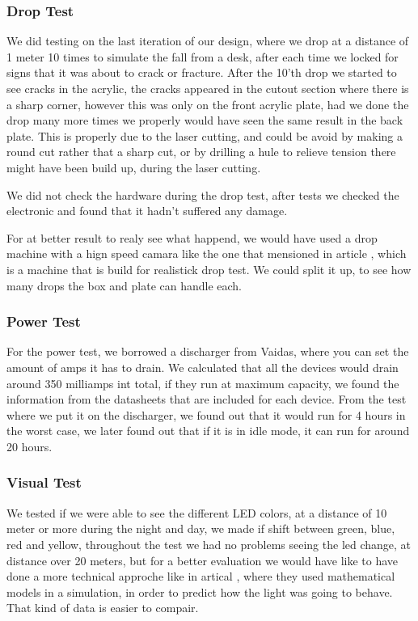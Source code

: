 \subsubsection{Drop Test}
We did testing on the last iteration of our design, where we drop at a distance of 1 meter 10 times to simulate the fall from a desk, after each time we locked for signs that it was about to crack or fracture.
After the 10'th drop we started to see cracks in the acrylic, the cracks appeared in the cutout section where there is a sharp corner, however this was only on the front acrylic plate, had we done the drop many more times we properly would have seen the same result in the back plate.
This is properly due to the laser cutting, and could be avoid by making a round cut rather that a sharp cut, or by drilling a hule to relieve tension there might have been build up, during the laser cutting.

We did not check the hardware during the drop test, after tests we checked the electronic and found that it hadn't suffered any damage.

For at better result to realy see what happend, we would have used a drop machine with a hign speed camara like the one that mensioned in article \cite{DropTest}, which is a machine that is build for realistick drop test.
We could split it up, to see how many drops the box and plate can handle each.

\subsubsection{Power Test}
For the power test, we borrowed a discharger from Vaidas, where you can set the amount of amps it has to drain.
We calculated that all the devices would drain around 350 milliamps int total, if they run at maximum capacity, we found the information from the datasheets that are included for each device.
From the test where we put it on the discharger, we found out that it would run for 4 hours in the worst case, we later found out that if it is in idle mode, it can run for around 20 hours.

\subsubsection{Visual Test}
We tested if we were able to see the different LED colors, at a distance of 10 meter or more during the night and day, we made if shift between green, blue, red and yellow, throughout the test we had no problems seeing the led change, at distance over 20 meters, but for a better evaluation we would have like to have done a more technical approche like in artical \cite{LEDLIGHT}, where they used mathematical models in a simulation, in order to predict how the light was going to behave. That kind of data is easier to compair.

